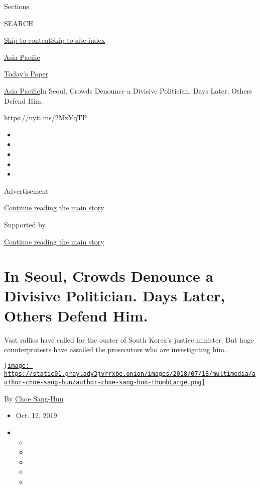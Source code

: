 Sections

SEARCH

\protect\hyperlink{site-content}{Skip to
content}\protect\hyperlink{site-index}{Skip to site index}

\href{https://www.nytimes3xbfgragh.onion/section/world/asia}{Asia
Pacific}

\href{https://myaccount.nytimes3xbfgragh.onion/auth/login?response_type=cookie\&client_id=vi}{}

\href{https://www.nytimes3xbfgragh.onion/section/todayspaper}{Today's
Paper}

\href{/section/world/asia}{Asia Pacific}\textbar{}In Seoul, Crowds
Denounce a Divisive Politician. Days Later, Others Defend Him.

\url{https://nyti.ms/2MzYqTP}

\begin{itemize}
\item
\item
\item
\item
\item
\end{itemize}

Advertisement

\protect\hyperlink{after-top}{Continue reading the main story}

Supported by

\protect\hyperlink{after-sponsor}{Continue reading the main story}

\hypertarget{in-seoul-crowds-denounce-a-divisive-politician-days-later-others-defend-him}{%
\section{In Seoul, Crowds Denounce a Divisive Politician. Days Later,
Others Defend
Him.}\label{in-seoul-crowds-denounce-a-divisive-politician-days-later-others-defend-him}}

Vast rallies have called for the ouster of South Korea's justice
minister. But huge counterprotests have assailed the prosecutors who are
investigating him.

\href{https://www.nytimes3xbfgragh.onion/by/choe-sang-hun}{\texttt{[image: https://static01.graylady3jvrrxbe.onion/images/2018/07/18/multimedia/author-choe-sang-hun/author-choe-sang-hun-thumbLarge.png]}}

By \href{https://www.nytimes3xbfgragh.onion/by/choe-sang-hun}{Choe
Sang-Hun}

\begin{itemize}
\item
  Oct. 12, 2019
\item
  \begin{itemize}
  \item
  \item
  \item
  \item
  \item
  \end{itemize}
\end{itemize}

